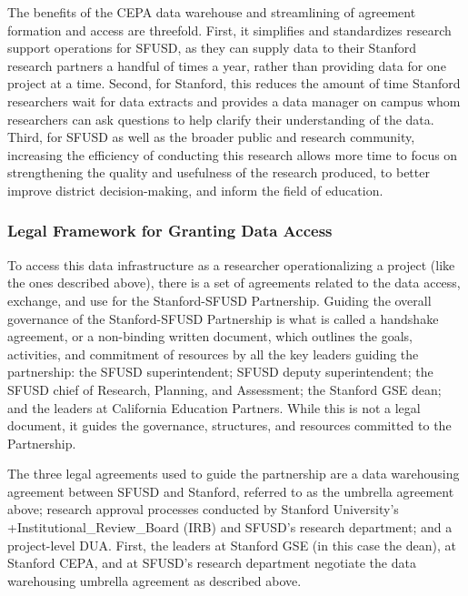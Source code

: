 \documentclass[
]{WileySix}
\begin{document}
The benefits of the CEPA data warehouse and streamlining of agreement formation and access are threefold. First, it simplifies and standardizes research support operations for SFUSD, as they can supply data to their Stanford research partners a handful of times a year, rather than providing data for one project at a time. Second, for Stanford, this reduces the amount of time Stanford researchers wait for data extracts and provides a data manager on campus whom researchers can ask questions to help clarify their understanding of the data. Third, for SFUSD as well as the broader public and research community, increasing the efficiency of conducting this research allows more time to focus on strengthening the quality and usefulness of the research produced, to better improve district decision-making, and inform the field of education.

\hypertarget{legal-framework-for-granting-data-access-5}{%
\subsubsection{Legal Framework for Granting Data Access}\label{legal-framework-for-granting-data-access-5}}

To access this data infrastructure as a researcher operationalizing a project (like the ones described above), there is a set of agreements related to the data access, exchange, and use for the Stanford-SFUSD Partnership. Guiding the overall governance of the Stanford-SFUSD Partnership is what is called a handshake agreement, or a non-binding written document, which outlines the goals, activities, and commitment of resources by all the key leaders guiding the partnership: the SFUSD superintendent; SFUSD deputy superintendent; the SFUSD chief of Research, Planning, and Assessment; the Stanford GSE dean; and the leaders at California Education Partners. While this is not a legal document, it guides the governance, structures, and resources committed to the Partnership.

The three legal agreements used to guide the partnership are a data warehousing agreement between SFUSD and Stanford, referred to as the umbrella agreement above; research approval processes conducted by Stanford University's +Institutional\_Review\_Board\textbar{} (IRB) and SFUSD's research department; and a project-level DUA. First, the leaders at Stanford GSE (in this case the dean), at Stanford CEPA, and at SFUSD's research department negotiate the data warehousing umbrella agreement as described above.
\end{document}
